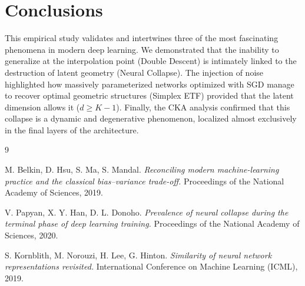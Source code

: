 \documentclass[10pt,twocolumn,letterpaper]{article}
\begin{document}
\section{Conclusions}
This empirical study validates and intertwines three of the most fascinating phenomena in modern deep learning. We demonstrated that the inability to generalize at the interpolation point (Double Descent) is intimately linked to the destruction of latent geometry (Neural Collapse). The injection of noise highlighted how massively parameterized networks optimized with SGD manage to recover optimal geometric structures (Simplex ETF) provided that the latent dimension allows it ($d \ge K-1$). Finally, the CKA analysis confirmed that this collapse is a dynamic and degenerative phenomenon, localized almost exclusively in the final layers of the architecture.

\begin{thebibliography}{9}

M. Belkin, D. Hsu, S. Ma, S. Mandal.
\textit{Reconciling modern machine-learning practice and the classical bias–variance trade-off.}
Proceedings of the National Academy of Sciences, 2019.

V. Papyan, X. Y. Han, D. L. Donoho.
\textit{Prevalence of neural collapse during the terminal phase of deep learning training.}
Proceedings of the National Academy of Sciences, 2020.

S. Kornblith, M. Norouzi, H. Lee, G. Hinton.
\textit{Similarity of neural network representations revisited.}
International Conference on Machine Learning (ICML), 2019.

\end{thebibliography}
\end{document}
